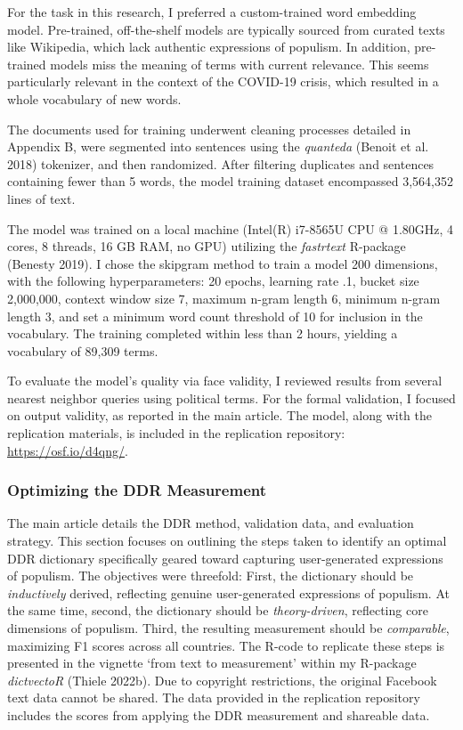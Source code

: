 \documentclass[
]{ccr}
\begin{document}
For the task in this research, I preferred a custom-trained word
embedding model. Pre-trained, off-the-shelf models are typically sourced
from curated texts like Wikipedia, which lack authentic expressions of
populism. In addition, pre-trained models miss the meaning of terms with
current relevance. This seems particularly relevant in the context of
the COVID-19 crisis, which resulted in a whole vocabulary of new words.

The documents used for training underwent cleaning processes detailed in
Appendix B, were segmented into sentences using the \emph{quanteda}
(Benoit et al. 2018) tokenizer, and then randomized. After filtering
duplicates and sentences containing fewer than 5 words, the model
training dataset encompassed 3,564,352 lines of text.

The model was trained on a local machine (Intel(R) i7-8565U CPU @
1.80GHz, 4 cores, 8 threads, 16 GB RAM, no GPU) utilizing the
\emph{fastrtext} R-package (Benesty 2019). I chose the skipgram method
to train a model 200 dimensions, with the following hyperparameters: 20
epochs, learning rate .1, bucket size 2,000,000, context window size 7,
maximum n-gram length 6, minimum n-gram length 3, and set a minimum word
count threshold of 10 for inclusion in the vocabulary. The training
completed within less than 2 hours, yielding a vocabulary of 89,309
terms.

To evaluate the model's quality via face validity, I reviewed results
from several nearest neighbor queries using political terms. For the
formal validation, I focused on output validity, as reported in the main
article. The model, along with the replication materials, is included in
the replication repository: \url{https://osf.io/d4qng/}.

\hypertarget{optimizing-the-ddr-measurement}{%
\subsubsection{Optimizing the DDR
Measurement}\label{optimizing-the-ddr-measurement}}

The main article details the DDR method, validation data, and evaluation
strategy. This section focuses on outlining the steps taken to identify
an optimal DDR dictionary specifically geared toward capturing
user-generated expressions of populism. The objectives were threefold:
First, the dictionary should be \emph{inductively} derived, reflecting
genuine user-generated expressions of populism. At the same time,
second, the dictionary should be \emph{theory-driven}, reflecting core
dimensions of populism. Third, the resulting measurement should be
\emph{comparable}, maximizing F1 scores across all countries. The R-code
to replicate these steps is presented in the vignette `from text to
measurement' within my R-package \emph{dictvectoR} (Thiele 2022b). Due
to copyright restrictions, the original Facebook text data cannot be
shared. The data provided in the replication repository includes the
scores from applying the DDR measurement and shareable data.
\end{document}
